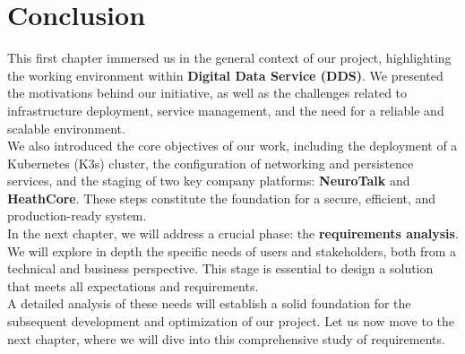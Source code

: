 \documentclass[a4paper,12pt]{report}
\begin{document}
\section{Conclusion}
\begin{doublespace}
\hspace{1cm}This first chapter immersed us in the general context of our project, highlighting the working environment within \textbf{Digital Data Service (DDS)}. We presented the motivations behind our initiative, as well as the challenges related to infrastructure deployment, service management, and the need for a reliable and scalable environment. \\

We also introduced the core objectives of our work, including the deployment of a Kubernetes (K3s) cluster, the configuration of networking and persistence services, and the staging of two key company platforms: \textbf{NeuroTalk} and \textbf{HeathCore}. These steps constitute the foundation for a secure, efficient, and production-ready system. \\

In the next chapter, we will address a crucial phase: the \textbf{requirements analysis}. We will explore in depth the specific needs of users and stakeholders, both from a technical and business perspective. This stage is essential to design a solution that meets all expectations and requirements. \\

A detailed analysis of these needs will establish a solid foundation for the subsequent development and optimization of our project. Let us now move to the next chapter, where we will dive into this comprehensive study of requirements. \\
\end{doublespace}

\renewcommand{\headrulewidth}{1pt}
\fancyhead[R]{\hspace*{4cm}}
\end{document}
